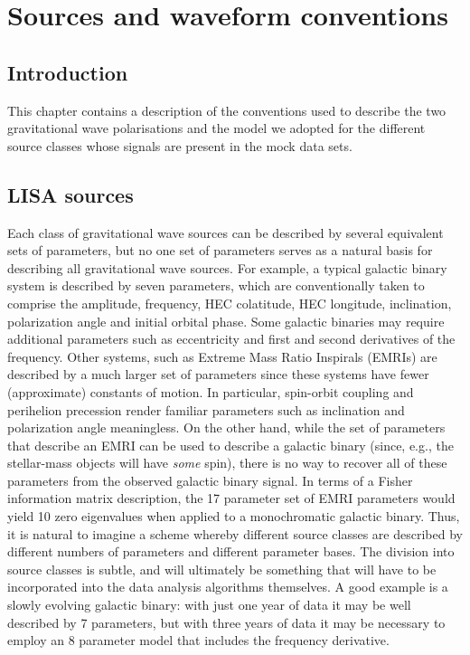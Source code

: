 \documentclass[11pt]{report}
\begin{document}
%
%

\chapter{Sources and waveform conventions}

\section{Introduction}

This chapter contains a description of the conventions used to describe the two gravitational wave polarisations and 
the model we adopted for the different source classes whose signals are present in the mock data sets.

\section{LISA sources}
\label{sec:sources}

Each class of gravitational wave sources can be described by several equivalent sets of parameters, but no one
set of parameters serves as a natural basis for describing all gravitational wave sources. For example,
a typical galactic binary system is described by seven parameters, which are conventionally taken to
comprise the amplitude, frequency, HEC colatitude, HEC longitude, inclination, polarization angle and initial
orbital phase. Some galactic binaries may require additional parameters such as eccentricity and first and
second derivatives of the frequency. Other systems, such as Extreme Mass Ratio Inspirals (EMRIs) are described
by a much larger set of parameters since these systems have fewer (approximate) constants of motion. In particular,
spin-orbit coupling and perihelion precession render familiar parameters such as inclination and polarization
angle meaningless. On the other hand, while the set of parameters that describe an EMRI can be used to
describe a galactic binary (since, e.g., the stellar-mass objects will have {\it some} spin), there is no way to 
recover all of these parameters from the observed galactic binary signal. In terms of
a Fisher information matrix description, the 17 parameter set of EMRI parameters would yield 10 zero eigenvalues
when applied to a monochromatic galactic binary. Thus, it is natural to imagine a scheme whereby different source
classes are described by different numbers of parameters and different parameter bases. The division into source
classes is subtle, and will ultimately be something that will have to be incorporated into the data analysis algorithms
themselves. A good example is a slowly evolving galactic binary: with just one year of data it may be well
described by 7 parameters, but with three years of data it may be necessary to employ an 8 parameter model
that includes the frequency derivative.
\end{document}
